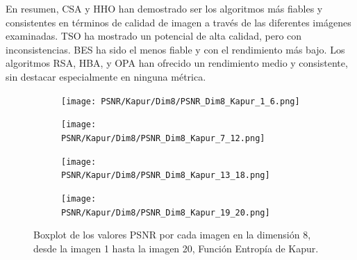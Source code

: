 \documentclass[conference]{IEEEtran}
\begin{document}
En resumen, CSA y HHO han demostrado ser los algoritmos más fiables y consistentes en términos de calidad de imagen a través de las diferentes imágenes examinadas. TSO ha mostrado un potencial de alta calidad, pero con inconsistencias. BES ha sido el menos fiable y con el rendimiento más bajo. Los algoritmos RSA, HBA, y OPA han ofrecido un rendimiento medio y consistente, sin destacar especialmente en ninguna métrica.
\begin{figure}[htbp] %
	\centering %
	\begin{subfigure}{0.4\textwidth}
		\texttt{[image: PSNR/Kapur/Dim8/PSNR\_Dim8\_Kapur\_1\_6.png]}
	\end{subfigure}
	
	\begin{subfigure}{0.4\textwidth}
		\texttt{[image: PSNR/Kapur/Dim8/PSNR\_Dim8\_Kapur\_7\_12.png]}
	\end{subfigure}
	
	\begin{subfigure}{0.4\textwidth}
		\texttt{[image: PSNR/Kapur/Dim8/PSNR\_Dim8\_Kapur\_13\_18.png]}
	\end{subfigure}
	
	\begin{subfigure}{0.4\textwidth}
		\texttt{[image: PSNR/Kapur/Dim8/PSNR\_Dim8\_Kapur\_19\_20.png]}
		\vspace{-120pt} %
	\end{subfigure}
	\caption{Boxplot de los valores PSNR por cada imagen en la dimensión 8, desde la imagen 1 hasta la imagen 20, Función Entropía de Kapur.}
	\label{fig:imagenes_dim8_1_20}    
\end{figure}
\end{document}
